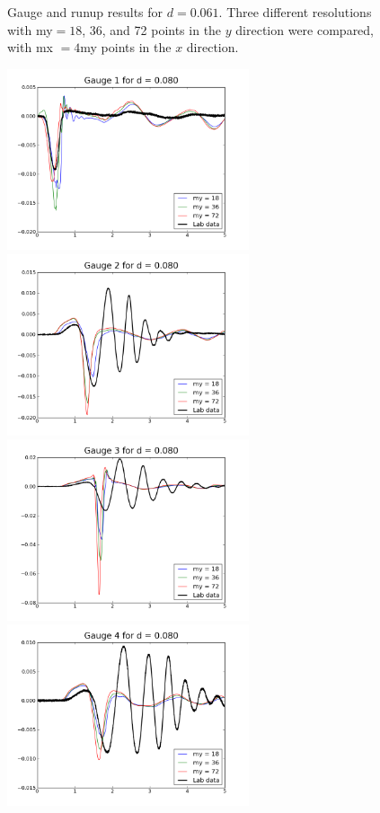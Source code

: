 \begin{figure}[ht]
\caption{\label{fig:bp3gauge1} 
Gauge and runup results for $d=0.061$.
Three different resolutions with my$=18$, 36,  and 72 points
in the $y$ direction were compared, with mx $= 4$my points in the $x$
direction.
  }
\end{figure}


\begin{figure}[ht]

\hfil\includegraphics[width=2.8in]{bp3/gauge1-d0-08.png}\hfil
\hfil\includegraphics[width=2.8in]{bp3/gauge2-d0-08.png}\hfil
\vskip 10pt
\hfil\includegraphics[width=2.8in]{bp3/gauge3-d0-08.png}\hfil
\hfil\includegraphics[width=2.8in]{bp3/gauge4-d0-08.png}\hfil

\end{figure}
